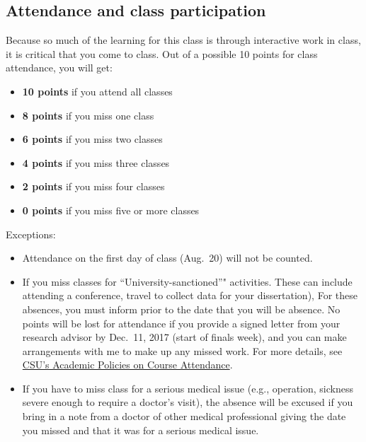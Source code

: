 \documentclass[]{book}
\providecommand{\tightlist}{%
  \setlength{\itemsep}{0pt}\setlength{\parskip}{0pt}}
\begin{document}
\hypertarget{attendance-and-class-participation}{%
\subsection{Attendance and class participation}\label{attendance-and-class-participation}}

Because so much of the learning for this class is through interactive work in class, it is critical that you come to class. Out of a possible 10 points for class attendance, you will get:

\begin{itemize}
\tightlist
\item
  \textbf{10 points} if you attend all classes
\item
  \textbf{8 points} if you miss one class
\item
  \textbf{6 points} if you miss two classes
\item
  \textbf{4 points} if you miss three classes
\item
  \textbf{2 points} if you miss four classes
\item
  \textbf{0 points} if you miss five or more classes
\end{itemize}

Exceptions:

\begin{itemize}
\tightlist
\item
  Attendance on the first day of class (Aug.~20) will not be counted.
\item
  If you miss classes for ``University-sanctioned''" activities. These can include attending a conference, travel to collect data for your dissertation), For these absences, you must inform prior to the date that you will be absence. No points will be lost for attendance if you provide a signed letter from your research advisor by Dec.~11, 2017 (start of finals week), and you can make arrangements with me to make up any missed work. For more details, see \href{http://catalog.colostate.edu/general-catalog/academic-standards/academic-policies/}{CSU's Academic Policies on Course Attendance}.
\item
  If you have to miss class for a serious medical issue (e.g., operation, sickness severe enough to require a doctor's visit), the absence will be excused if you bring in a note from a doctor of other medical professional giving the date you missed and that it was for a serious medical issue.
\end{itemize}
\end{document}
